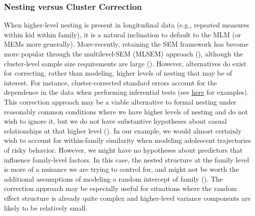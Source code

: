 \documentclass[11pt]{article}
\begin{document}
\subsubsection{Nesting versus Cluster Correction}
When higher-level nesting is present in longitudinal data (e.g., repeated measures within kid within family), it is a natural inclination to default to the MLM (or MEMs more generally). More-recently, retaining the SEM framework has become more popular through the multilevel-SEM (MLSEM) approach (\cite{muthen_latent_1989,preacher_general_2010}), although the cluster-level sample size requirements are large (\cite{hox_accuracy_2001}). However, alternatives do exist for correcting, rather than modeling, higher levels of nesting that may be of interest. For instance, cluster-corrected standard errors account for the dependence in the data when performing inferential tests (see \href{https://e-m-mccormick.github.io/static/longitudinal-primer/06-nesting.html#cluster-correction}{here} for examples). This correction approach may be a viable alternative to formal nesting under reasonably common conditions where we have higher levels of nesting and do not wish to ignore it, but we do not have substantive hypotheses about casual relationships at that higher level (\cite{mcneish_unnecessary_2017}). In our example, we would almost certainly wish to account for within-family similarity when modeling adolescent trajectories of risky behavior. However, we might have no hypotheses about predictors that influence family-level factors. In this case, the nested structure at the family level is more of a nuisance we are trying to control for, and might not be worth the additional assumptions of modeling a random intercept of family (\cite{mcneish_unnecessary_2017,mcneish_accommodating_2017}). The correction approach may be especially useful for situations where the random effect structure is already quite complex and higher-level variance components are likely to be relatively small.
\end{document}
